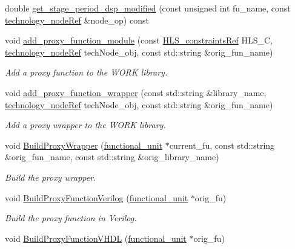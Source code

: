 \begin{DoxyCompactItemize}
\item 
double \hyperlink{classallocation_a6e86c7e93c8e3f957d1e152b3732fa44}{get\+\_\+stage\+\_\+period\+\_\+dsp\+\_\+modified} (const unsigned int fu\+\_\+name, const \hyperlink{technology__node_8hpp_a33dd193b7bd6b987bf0d8a770a819fa7}{technology\+\_\+node\+Ref} \&node\+\_\+op) const
\item 
void \hyperlink{classallocation_a4084c75f1c138f51b8b7f3c609d45d01}{add\+\_\+proxy\+\_\+function\+\_\+module} (const \hyperlink{hls__constraints_8hpp_ac394d1c5cd991614133724294a79182b}{H\+L\+S\+\_\+constraints\+Ref} H\+L\+S\+\_\+C, \hyperlink{technology__node_8hpp_a33dd193b7bd6b987bf0d8a770a819fa7}{technology\+\_\+node\+Ref} tech\+Node\+\_\+obj, const std\+::string \&orig\+\_\+fun\+\_\+name)
\begin{DoxyCompactList}\small\item\em Add a proxy function to the W\+O\+RK library. \end{DoxyCompactList}\item 
void \hyperlink{classallocation_afa7e3452b30f32920f34aaad4d3299ed}{add\+\_\+proxy\+\_\+function\+\_\+wrapper} (const std\+::string \&library\+\_\+name, \hyperlink{technology__node_8hpp_a33dd193b7bd6b987bf0d8a770a819fa7}{technology\+\_\+node\+Ref} tech\+Node\+\_\+obj, const std\+::string \&orig\+\_\+fun\+\_\+name)
\begin{DoxyCompactList}\small\item\em Add a proxy wrapper to the W\+O\+RK library. \end{DoxyCompactList}\item 
void \hyperlink{classallocation_a6a0e21dd875ccd2320ec1c3032bd53c1}{Build\+Proxy\+Wrapper} (\hyperlink{structfunctional__unit}{functional\+\_\+unit} $\ast$current\+\_\+fu, const std\+::string \&orig\+\_\+fun\+\_\+name, const std\+::string \&orig\+\_\+library\+\_\+name)
\begin{DoxyCompactList}\small\item\em Build the proxy wrapper. \end{DoxyCompactList}\item 
void \hyperlink{classallocation_ac305b0fc0edfc7c02e39b37a5615260f}{Build\+Proxy\+Function\+Verilog} (\hyperlink{structfunctional__unit}{functional\+\_\+unit} $\ast$orig\+\_\+fu)
\begin{DoxyCompactList}\small\item\em Build the proxy function in Verilog. \end{DoxyCompactList}\item 
void \hyperlink{classallocation_ab924181104812480fb5f27f23599487c}{Build\+Proxy\+Function\+V\+H\+DL} (\hyperlink{structfunctional__unit}{functional\+\_\+unit} $\ast$orig\+\_\+fu)

\end{DoxyCompactItemize}
